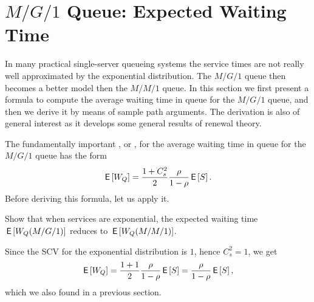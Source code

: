 \section{$M/G/1$ Queue: Expected Waiting Time}
\label{sec:mg1}




In many practical single-server queueing systems the service times are not really well approximated by the exponential distribution.
The $M/G/1$ queue then becomes a better model then the $M/M/1$ queue.
In this section we first present a formula to compute the average waiting time in queue for the $M/G/1$ queue, and then we derive it by means of sample path arguments.
The derivation is also of general interest as it develops some general results of renewal theory.


The fundamentally important , or , for the average waiting time in queue for the $M/G/1$ queue has the form
\begin{equation} \label{eq:710}
  \,\mathsf{E}\left[W_Q\right] = \frac{1 + C_s^2}2 \frac{\rho}{1-\rho}  \,\mathsf{E}\left[S\right].
\end{equation}
Before deriving this formula, let us apply it.

\begin{extra}
  Show that when services are exponential, the expected waiting time $\,\mathsf{E}\left[W_Q(M/G/1)\right]$ reduces to $\,\mathsf{E}\left[W_Q(M/M/1)\right]$.
\begin{solution}
      Since the SCV for the exponential distribution is $1$, hence
      $C_s^2=1$, we get 
    \begin{equation*}
\,\mathsf{E}\left[W_Q\right] = \frac{1+1}2\frac{\rho}{1-\rho} \,\mathsf{E}\left[S\right] = \frac{\rho}{1-\rho} \,\mathsf{E}\left[S\right],
    \end{equation*}
which we also found in a previous section.
\end{solution}
\end{extra}


